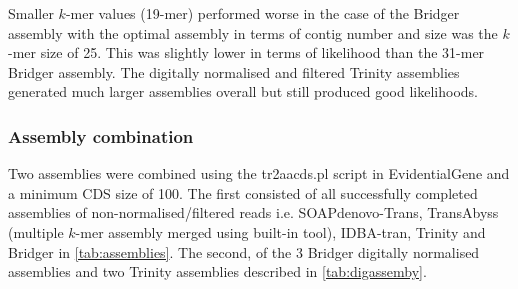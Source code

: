 Smaller \(k\)-mer values (19-mer) performed worse in the case of the Bridger assembly
with the optimal assembly in terms of contig number and size was the \(k\)-mer size 
of 25.  This was slightly lower in terms of likelihood than the 31-mer Bridger
assembly. The digitally normalised and filtered Trinity assemblies 
generated much larger assemblies overall but still produced good likelihoods.

\subsubsection{Assembly combination}

Two assemblies were combined using the tr2aacds.pl script in EvidentialGene 
and a minimum CDS size of 100. The first consisted of all successfully completed
assemblies of non-normalised/filtered reads i.e. SOAPdenovo-Trans, TransAbyss (multiple \(k\)-mer
assembly merged using built-in tool),
IDBA-tran, Trinity and Bridger in \cref{tab:assemblies}.  The second, 
of the 3 Bridger digitally normalised assemblies and two Trinity assemblies 
described in \cref{tab:digassemby}.

\begin{table}[h!]

    \caption[Merged Assembly Summary]{Summary of merged multi-assemblies.  Collapsed contigs is the number of contigs
    found in the merged set by the EvidentialGene pipeline. The level of assembly
reduction and redundancy removal is high and, at first appearance, is impressively consistent 
between meta-assemblies despite differences in preprocessing. 
  However, CD-HIT metaclustering
at 90\% identity shown at the bottom demonstrated that there was very little overlap between
these two minimised assemblies.  Even the merged normalised assemblies generated
a meta-assembly of lower overall likelihood than the best individual constituent assemblies.}
    \label{tab:comb_assemb}
\end{table}

